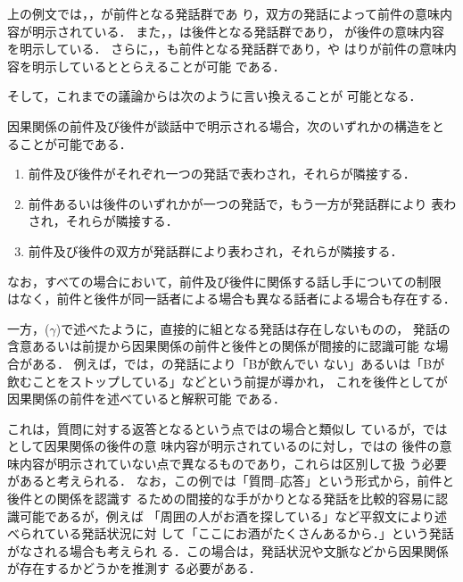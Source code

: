上の例文では，，が前件となる発話群であ
り，双方の発話によって前件の意味内容が明示されている．
また，，は後件となる発話群であり，
が後件の意味内容を明示している．
さらに，，も前件となる発話群であり，や
はりが前件の意味内容を明示しているととらえることが可能
である．

そして，これまでの議論からは次のように言い換えることが
可能となる．

\begin{screen}
 \begin{obs}
  因果関係の前件及び後件が談話中で明示される場合，次のいずれかの構造をと
  ることが可能である．
 \begin{enumerate}
  \item 前件及び後件がそれぞれ一つの発話で表わされ，それらが隣接する．
  \item 前件あるいは後件のいずれかが一つの発話で，もう一方が発話群により
	表わされ，それらが隣接する．
  \item 前件及び後件の双方が発話群により表わされ，それらが隣接する．
 \end{enumerate}
 なお，すべての場合において，前件及び後件に関係する話し手についての制限
 はなく，前件と後件が同一話者による場合も異なる話者による場合も存在する．
 \end{obs}
\end{screen}

一方，($\gamma$)で述べたように，直接的に組となる発話は存在しないものの，
発話の含意あるいは前提から因果関係の前件と後件との関係が間接的に認識可能
な場合がある．
例えば，では，の発話により「Bが飲んでい
ない」あるいは「Bが飲むことをストップしている」などという前提が導かれ，
これを後件としてが因果関係の前件を述べていると解釈可能
である．


これは，質問に対する返答となるという点ではの場合と類似し
ているが，ではとして因果関係の後件の意
味内容が明示されているのに対し，ではの
後件の意味内容が明示されていない点で異なるものであり，これらは区別して扱
う必要があると考えられる．
なお，この例では「質問--応答」という形式から，前件と後件との関係を認識す
るための間接的な手がかりとなる発話を比較的容易に認識可能であるが，例えば
「周囲の人がお酒を探している」など平叙文により述べられている発話状況に対
して「ここにお酒がたくさんあるから．」という発話がなされる場合も考えられ
る．この場合は，発話状況や文脈などから因果関係が存在するかどうかを推測す
る必要がある．

